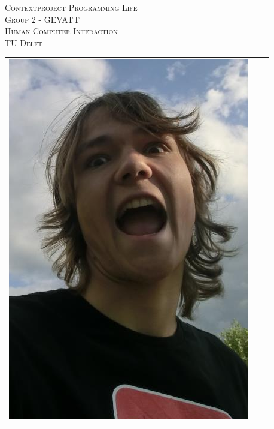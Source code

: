 \begin{titlepage}
\begin{center}
\textsc{\LARGE Contextproject Programming Life}\\
\vspace{5pt}
\textsc{\LARGE Group 2 - GEVATT}\\
\vspace{5pt}
\textsc{\LARGE Human-Computer Interaction}\\
\vspace{5pt}
\textsc{\large TU Delft}

\begin{table}[ht]
\centering
\begin{tabular}{ccc}
\includegraphics[scale=0.2]{../photos/ruben.png}   &

\end{tabular}
\end{table}
\end{center}
\end{titlepage}
